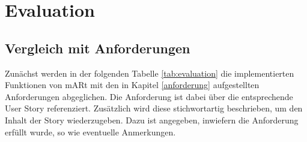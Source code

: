 

\chapter{Evaluation}
\label{evaluation}

\section{Vergleich mit Anforderungen}

Zunächst werden in der folgenden Tabelle \ref{tab:evaluation} die implementierten Funktionen von mARt mit den in Kapitel \ref{anforderung} aufgestellten Anforderungen abgeglichen. Die Anforderung ist dabei über die entsprechende User Story referenziert. Zusätzlich wird diese stichwortartig beschrieben, um den Inhalt der Story wiederzugeben. Dazu ist angegeben, inwiefern die Anforderung erfüllt wurde, so wie eventuelle Anmerkungen. 

